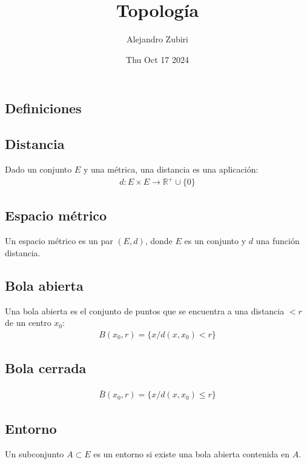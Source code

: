 \documentclass{article}
\author{Alejandro Zubiri}
\date{Thu Oct 17 2024}
\title{Topología}
\begin{document}
\maketitle
\begin{multicols}{2}
    \section{Definiciones}
    \subsection{Distancia}
    Dado un conjunto $E$ y una métrica, una distancia es una aplicación:
    \begin{equation}
        \begin{split}
            d: E \times E \to \mathbb{R}^+ \cup \{ 0 \}
        \end{split}
    \end{equation}
    \subsection{Espacio métrico}
    Un espacio métrico es un par $(E,d)$, donde $E$ es un conjunto y $d$ una función distancia.
    \subsection{Bola abierta}
    Una bola abierta es el conjunto de puntos que se encuentra a una distancia $<r$ de un centro $x_{0}$:
    \begin{equation}
        \begin{split}
            B(x_{0},r)= \{ x / d(x,x_{0})<r \}
        \end{split}
    \end{equation}
    \subsection{Bola cerrada}
    \begin{equation}
        \begin{split}
            \bar{B}( x_{0},r)= \{ x / d(x,x_{0}) \leq r \}
        \end{split}
    \end{equation}
    \subsection{Entorno}
    Un subconjunto $A \subset E$ es un entorno si existe una bola abierta contenida en $A$.

\end{multicols}
\end{document}
